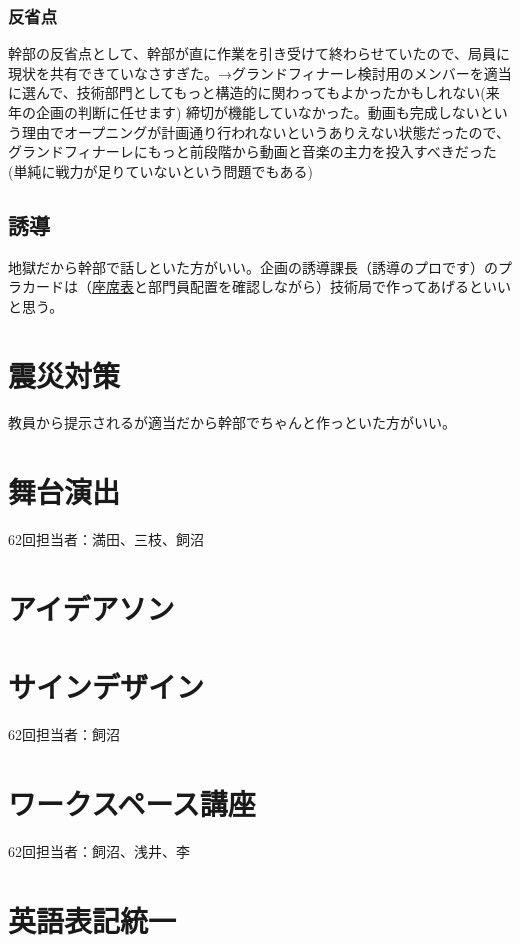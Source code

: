 \documentclass[dvipdfmx,jb5]{jreport}
\begin{document}
\subsubsection{反省点}
幹部の反省点として、幹部が直に作業を引き受けて終わらせていたので、局員に現状を共有できていなさすぎた。→グランドフィナーレ検討用のメンバーを適当に選んで、技術部門としてもっと構造的に関わってもよかったかもしれない(来年の企画の判断に任せます)
締切が機能していなかった。動画も完成しないという理由でオープニングが計画通り行われないというありえない状態だったので、グランドフィナーレにもっと前段階から動画と音楽の主力を投入すべきだった(単純に戦力が足りていないという問題でもある)
\subsection{誘導}
地獄だから幹部で話しといた方がいい。企画の誘導課長（誘導のプロです）のプラカードは（\href{https://docs.google.com/spreadsheets/d/1C1FCAPzH2EJLlMtq1CIA2K3Q68W5yUGb/edit?usp=sharing&ouid=113160890995933864933&rtpof=true&sd=true}{座席表}と部門員配置を確認しながら）技術局で作ってあげるといいと思う。

\section{震災対策}
教員から提示されるが適当だから幹部でちゃんと作っといた方がいい。

\section{舞台演出}
62回担当者：満田、三枝、飼沼

\section{アイデアソン}

\section{サインデザイン}
62回担当者：飼沼

\section{ワークスペース講座}
62回担当者：飼沼、浅井、李

\section{英語表記統一}
\end{document}
